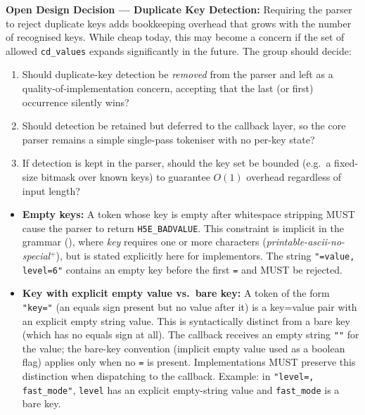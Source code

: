 \documentclass[../HDF5_RFC.tex]{subfiles}
\begin{document}
\noindent\colorbox{yellow!25}{\parbox{\dimexpr\linewidth-2\fboxsep}{%
  \textbf{Open Design Decision --- Duplicate Key Detection:}
  Requiring the parser to reject duplicate keys adds bookkeeping overhead
  that grows with the number of recognised keys.  While cheap today, this
  may become a concern if the set of allowed \texttt{cd\_values} expands
  significantly in the future.  The group should decide:
  \begin{enumerate}
    \item Should duplicate-key detection be \emph{removed} from the parser
          and left as a quality-of-implementation concern, accepting that
          the last (or first) occurrence silently wins?
    \item Should detection be retained but deferred to the callback layer,
          so the core parser remains a simple single-pass tokeniser with no
          per-key state?
    \item If detection is kept in the parser, should the key set be bounded
          (e.g.\ a fixed-size bitmask over known keys) to guarantee $O(1)$
          overhead regardless of input length?
  \end{enumerate}
}}

\begin{itemize}
\item \textbf{Empty keys:} A token whose key is empty after whitespace stripping MUST
  cause the parser to return \texttt{H5E\_BADVALUE}. This constraint is implicit in
  the grammar (), where \textit{key} requires
  one or more characters (\textit{printable-ascii-no-special}$^+$), but is
  stated explicitly here for implementors. The string \texttt{"=value, level=6"}
  contains an empty key before the first \texttt{=} and MUST be rejected.
\item \textbf{Key with explicit empty value vs.\ bare key:} A token of the form
  \texttt{"key="} (an equals sign present but no value after it) is a key=value
  pair with an explicit empty string value. This is syntactically distinct
  from a bare key (which has no equals sign at all). The callback receives
  an empty string \texttt{""} for the value; the bare-key convention (implicit
  empty value used as a boolean flag) applies only when no \texttt{=} is present.
  Implementations MUST preserve this distinction when dispatching to the
  callback. Example: in \texttt{"level=, fast\_mode"}, \texttt{level} has an explicit
  empty-string value and \texttt{fast\_mode} is a bare key.
\end{itemize}
\end{document}

